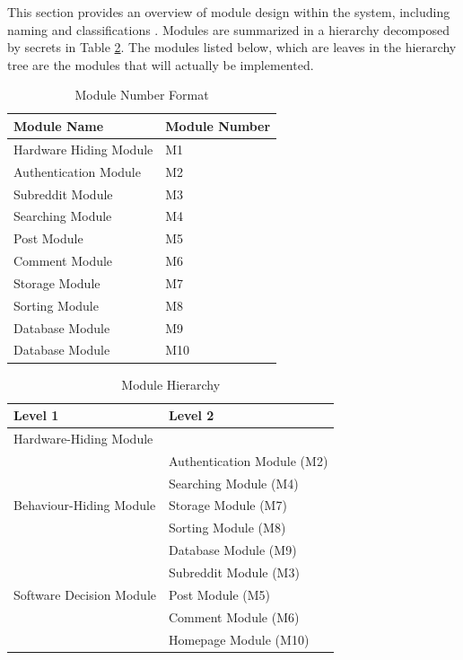 \documentclass[12pt,fleqn]{article}
\begin{document}
This section provides an overview of module design within the system, including naming and classifications . Modules are summarized
in a hierarchy decomposed by secrets in Table \ref{TblMH}. The modules listed
below, which are leaves in the hierarchy tree are the modules that will
actually be implemented.

\begin{table}[!htbp]
	\begin{tabular}{ll}
		\toprule
		Module Name & Module Number \\
		\midrule
		Hardware Hiding Module & M1\\
		\midrule
		Authentication Module & M2\\
		\midrule
		Subreddit Module & M3\\
		\midrule
		Searching Module & M4\\
		\midrule
		Post Module & M5\\
		\midrule
		Comment Module & M6\\
		\midrule
		Storage Module & M7\\
		\midrule
		Sorting Module & M8\\
		\midrule
		Database Module & M9\\
		\midrule
		Database Module & M10\\
		\bottomrule
	\end{tabular}
	\caption{Module Number Format}
	\makeatletter
	\def\rulecolor#1#{\CT@arc{#1}}
	\def\CT@arc#1#2{%
		\ifdim\baselineskip=\z@\noalign\fi
		{\gdef\CT@arc@{\color#1{#2}}}}
	\let\CT@arc@\relax
	\makeatother
	\label{Table 1}
\end{table}

\vspace{5mm}

\begin{table}[h!]
\centering
\begin{tabular}{p{} p{}}
\toprule
\textbf{Level 1} & \textbf{Level 2}\\
\midrule

{Hardware-Hiding Module} & ~ \\
\midrule

\multirow{5}{0.3\textwidth}{Behaviour-Hiding Module} 
& Authentication Module (M2)\\
& Searching Module (M4)\\
& Storage Module (M7)\\
& Sorting Module (M8)\\ 
& Database Module (M9)\\
\midrule

\multirow{3}{0.3\textwidth}{Software Decision Module}
& Subreddit Module (M3)\\
& Post Module (M5)\\
& Comment Module (M6)\\
& Homepage Module (M10)\\
\bottomrule

\end{tabular}
\caption{Module Hierarchy}
\label{TblMH}
\end{table}
\newpage
\end{document}
